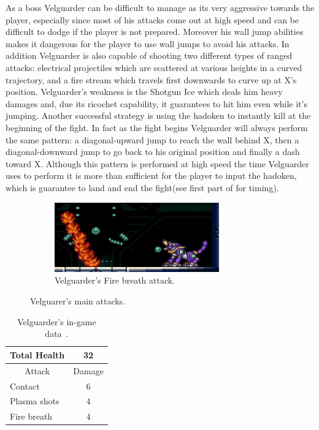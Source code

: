As a boss Velguarder can be difficult to manage as its very aggressive towards the player, especially since most of his attacks come out at high speed and can be difficult to dodge if the player is not prepared. Moreover his wall jump abilities makes it dangerous for the player to use wall jumps to avoid his attacks. In addition Velguarder is also capable of shooting two different types of ranged attacks: electrical projectiles which are scattered at various heights in a curved trajectory, and a fire stream which travels first downwards to curve up at X's position. Velguarder's weakness is the Shotgun Ice which deals him heavy damages and, due its ricochet capability, it guarantees to hit him even while it's jumping. Another successful strategy is using the hadoken to instantly kill at the beginning of the fight. In fact as the fight begins Velguarder will always perform the same pattern: a diagonal-upward jump to reach the wall behind X, then a diagonal-downward jump to go back to his original position and finally a dash toward X. Although this pattern is performed at high speed the time Velguarder uses to perform it is more than sufficient for the player to input the hadoken, which is guarantee to land and end the fight(see first part of  for timing).
\begin{figure}[htp]
	\ContinuedFloat
	\centering
	\begin{subfigure}[t]{\linewidth}
		\centering
		\includegraphics[height=3cm]{figures/X1/Sigma_stages/Velguarder_fire.jpg}
		\caption{Velguarder's Fire breath attack.}
	\end{subfigure}
	\caption{Velguarer's main attacks.}
\end{figure} 
\begin{table}
	\centering
	\begin{tabular}[h]{l c}
		\toprule
		Total Health  & 32\\
		\midrule
		\multicolumn{1}{c}{Attack} & \multicolumn{1}{c}{Damage}\\
		Contact & 6\\
		Plasma shots& 4\\
		Fire breath& 4\\
		\bottomrule
	\end{tabular}
	\caption{Velguarder's in-game data~\cite{wiki:Velguarder}.}
\end{table}

